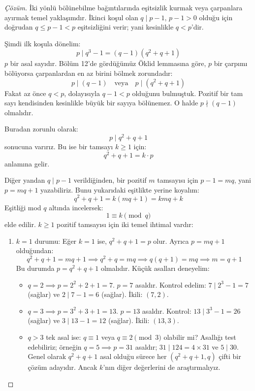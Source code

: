 \begin{proof}[Çözüm]
İki yönlü bölünebilme bağıntılarında eşitsizlik kurmak veya çarpanlara ayırmak temel yaklaşımdır. İkinci koşul olan $q \mid p - 1$, $p - 1 > 0$ olduğu için doğrudan $q \le p - 1 < p$ eşitsizliğini verir; yani kesinlikle $q < p$'dir.

Şimdi ilk koşula dönelim:
\[
p \mid q^3 - 1 = (q - 1)(q^2 + q + 1)
\]
$p$ bir asal sayıdır. Bölüm 12'de gördüğümüz Öklid lemmasına göre, $p$ bir çarpımı bölüyorsa çarpanlardan en az birini bölmek zorundadır:
\[
p \mid (q - 1) \quad \text{veya} \quad p \mid (q^2 + q + 1)
\]
Fakat az önce $q < p$, dolayısıyla $q - 1 < p$ olduğunu bulmuştuk. Pozitif bir tam sayı kendisinden kesinlikle büyük bir sayıya bölünemez. O halde $p \nmid (q - 1)$ olmalıdır.

Buradan zorunlu olarak:
\[
p \mid q^2 + q + 1
\]
sonucuna varırız. Bu ise bir tamsayı $k \ge 1$ için:
\[
q^2 + q + 1 = k \cdot p
\]
anlamına gelir. 

Diğer yandan $q \mid p - 1$ verildiğinden, bir pozitif $m$ tamsayısı için $p - 1 = m q$, yani $p = m q + 1$ yazabiliriz. Bunu yukarıdaki eşitlikte yerine koyalım:
\[
q^2 + q + 1 = k(mq + 1) = kmq + k
\]
Eşitliği mod $q$ altında incelersek:
\[
1 \equiv k \pmod q
\]
elde edilir. $k \ge 1$ pozitif tamsayısı için iki temel ihtimal vardır:
\begin{enumerate}
    \item $k = 1$ durumu:
    Eğer $k = 1$ ise, $q^2 + q + 1 = p$ olur. 
    Ayrıca $p = mq + 1$ olduğundan:
    \[
    q^2 + q + 1 = mq + 1 \implies q^2 + q = mq \implies q(q + 1) = mq \implies m = q + 1
    \]
    Bu durumda $p = q^2 + q + 1$ olmalıdır. Küçük asalları deneyelim:
    \begin{itemize}
        \item $q = 2 \implies p = 2^2 + 2 + 1 = 7$. $p=7$ asaldır. Kontrol edelim: $7 \mid 2^3 - 1 = 7$ (sağlar) ve $2 \mid 7 - 1 = 6$ (sağlar). İkili: $(7, 2)$.
        \item $q = 3 \implies p = 3^2 + 3 + 1 = 13$. $p=13$ asaldır. Kontrol: $13 \mid 3^3 - 1 = 26$ (sağlar) ve $3 \mid 13 - 1 = 12$ (sağlar). İkili: $(13, 3)$.
        \item $q > 3$ tek asal ise: $q \equiv 1$ veya $q \equiv 2 \pmod 3$ olabilir mi? Asallığı test edebiliriz; örneğin $q=5 \implies p=31$ asaldır; $31 \mid 124 = 4 \times 31$ ve $5 \mid 30$. Genel olarak $q^2+q+1$ asal olduğu sürece her $(q^2+q+1, q)$ çifti bir çözüm adayıdır. Ancak $k$'nın diğer değerlerini de araştırmalıyız.
    \end{itemize}


\end{enumerate}
\end{proof}
